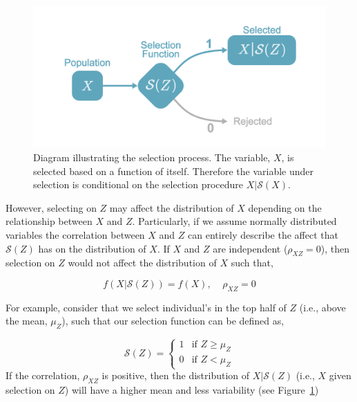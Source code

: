 \documentclass[
  letterpaper,
  DIV=11,
  numbers=noendperiod]{scrreprt}
\begin{document}
\begin{figure}[H]

{\centering \includegraphics{figure/indirect_select_diagram.png}

}

\caption{\label{fig-indirect-select-diag}Diagram illustrating the
selection process. The variable, \(X\), is selected based on a function
of itself. Therefore the variable under selection is conditional on the
selection procedure \(X|\mathcal{S}(X)\).}

\end{figure}

However, selecting on \(Z\) may affect the distribution of \(X\)
depending on the relationship between \(X\) and \(Z\). Particularly, if
we assume normally distributed variables the correlation between \(X\)
and \(Z\) can entirely describe the affect that \(\mathcal{S}(Z)\) has
on the distribution of \(X\). If \(X\) and \(Z\) are independent
(\(\rho_{XZ}=0\)), then selection on \(Z\) would not affect the
distribution of \(X\) such that,

\[
f(X|\mathcal{S}(Z)) = f(X),\;\;\;\; \rho_{XZ}= 0
\]

For example, consider that we select individual's in the top half of
\(Z\) (i.e., above the mean, \(\mu_{Z}\)), such that our selection
function can be defined as,

\[\mathcal{S}(Z) = \begin{cases}1 & \text{if }Z\geq\mu_{Z}\\ 0 & \text{if }Z<\mu_{Z} \end{cases}\]
If the correlation, \(\rho_{XZ}\) is positive, then the distribution of
\(X|\mathcal{S}(Z)\) (i.e., \(X\) given selection on \(Z\)) will have a
higher mean and less variability (see
Figure~\ref{fig-indirect-select-diag})
\end{document}
